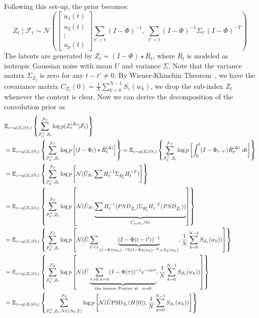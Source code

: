 \documentclass[10pt]{article}
\numberwithin{figure}{section}
\begin{document}
Following this set-up, the prior becomes:
\begingroup
\setlength{\abovedisplayskip}{4pt}
\setlength{\belowdisplayskip}{4pt}
\[
Z_t \mid \mathcal{F}_t \sim \mathcal{N} \left( 
\left[
\begin{smallmatrix}
u_1(t) \\
u_2(t) \\
\vdots \\
u_p(t)
\end{smallmatrix}
\right] 
\sum_{t' < t} (I - \Phi)^{-1},\;
\sum_{t' < t} (I - \Phi)^{-1} \Sigma_{t'} (I - \Phi)^{-T}
\right)
\]
\endgroup
The latents are generated by \(Z_t = (I-\Phi) \star R_t\), where \(R_t\) is modeled as isotropic Gaussian noise with mean \(U\) and variance \(\Sigma\). Note that the variance matrix $\Sigma_{Z_t}$ is zero for any $t-t'\ne 0$.  By Wiener-Khinchin Theorem~\citep{wiener1949}, we have the covariance matrix $C_{Z_t}(0) = \frac{1}{N}\sum\limits_{k=0}^{N-1}S_z(w_k)$, we drop the sub-index $Z_t$ whenever the context is clear. Now we can derive the decomposition of the convolution prior as
\begingroup
\setlength{\abovedisplayskip}{6pt}
\setlength{\belowdisplayskip}{6pt}
    \begin{align}
       &\mathbb{E}_{z\sim q(Z_t|O_t)}\left\{ \sum\limits_{\mathcal{F}_0^+,Z_t}^{\mathcal{F}_T} \log p (Z_t^{(\Delta)}|\mathcal{F}_t)\right\} \notag\\
&  =\mathbb{E}_{z\sim q(Z_t|O_t)}\left\{ \sum\limits_{\mathcal{F}_0^+,Z_t}^{\mathcal{F}_T} \log p\left[(I-\Phi_{t})\star \hat R_{t}^{(\Delta)}\right]\right\} = \mathbb{E}_{z\sim q(Z_t|O_t)}\left\{ \sum\limits_{\mathcal{F}_0^+,Z_t}^{\mathcal{F}_T} \log p\left[\int_{0}^{t}(I-\Phi_{t-t'}) \hat R_{t'}^{(\Delta)}\ dt \right]\right\} \notag\\
&= \mathbb{E}_{z\sim q(Z_t|O_t)}\left\{ \sum\limits_{\mathcal{F}_0^+,Z_t}^{\mathcal{F}_T} \log p\left[\mathcal{N}(\hat U_R, \sum\limits_{}^{} H_t^{-1}\Sigma_{\hat R_t'} H_t^{-T})\right]\right\} \notag \\
&=  \mathbb{E}_{z\sim q(Z_t|O_t)}\left\{ \sum\limits_{\mathcal{F}_0^+,Z_t}^{\mathcal{F}_T} \log p\left[\mathcal{N}(\hat U_R, \underbrace{\sum\limits_{}^{} H_t^{-1}(PSD_{\hat Z_t})\Sigma_{\hat R_t'} H_t^{-T}(PSD_{\hat Z_t}))}_{C_{p(Z_t)}(0)}\right]\right\} \notag\\
& =\mathbb{E}_{z\sim q(Z_t|O_t)}\left\{ \sum\limits_{\mathcal{F}_0^+,Z_t}^{\mathcal{F}_T} \log p\left[\mathcal{N}(\hat U\sum\limits_{t'<t}\underbrace{(I-\Phi(t-t'))^{-1}}_{(1-\Phi)(w_k)^{-1}\Sigma (1-\Phi)(w_k)^{-H}=S_{Z}(w_k)}, \frac{1}{N}\sum\limits_{k=0}^{N-1} S_{Z_t}(w_k))\right]\right\}\\
&=\mathbb{E}_{z\sim q(Z_t|O_t)}\left\{ \sum\limits_{\mathcal{F}_0^+,Z_t}^{\mathcal{F}_T} \log p\left[\mathcal{N}(\hat U\underbrace{\sum\limits_{\tau>0,w=0}(I-\Phi(\tau))^{-1}e^{-jw\tau}}_{\textnormal{the inverse Fourier at}~\ w=0}, \frac{1}{N}\sum\limits_{k=0}^{N-1} S_{Z_t}(w_k))\right]\right\} \notag \\
&=\mathbb{E}_{z\sim q(Z_t|O_t)}\left\{ \sum\limits_{\mathcal{F}_0^+,Z_t,N\in(N_0,T)}^{\mathcal{F}_T} \log p\left[\mathcal{N}(\hat U \mathrm{PSD}_{Z_t}(H(0)), \frac{1}{N}\sum\limits_{k=0}^{N-1} S_{Z_t}(w_k))\right]\right\} \label{final_ELBO}
    \end{align}
\end{document}
